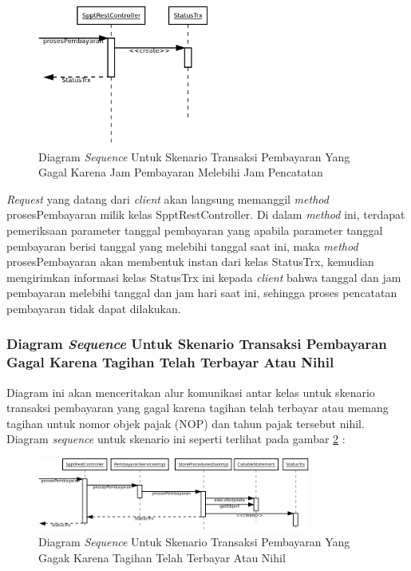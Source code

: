 \documentclass[pdftex,12pt, oneside]{article}
\begin{document}
\begin{figure}[H]
  \centering
  \includegraphics[width=0.5\textwidth]{./resources/uml/uml-seq-trx-tgl-bayar-error}
  \caption{Diagram \textit{Sequence} Untuk Skenario Transaksi Pembayaran Yang Gagal Karena Jam Pembayaran Melebihi Jam Pencatatan}
  \label{fig:uml-seq-trx-tgl-bayar-error}
\end{figure}

\textit{Request} yang datang dari \textit{client} akan langsung memanggil \textit{method} prosesPembayaran milik kelas SpptRestController. Di dalam \textit{method} ini, terdapat pemeriksaan parameter tanggal pembayaran yang apabila parameter tanggal pembayaran berisi tanggal yang melebihi tanggal saat ini, maka \textit{method} prosesPembayaran akan membentuk instan dari kelas StatusTrx, kemudian mengirimkan informasi kelas StatusTrx ini kepada \textit{client} bahwa tanggal dan jam pembayaran melebihi tanggal dan jam hari saat ini, sehingga proses pencatatan pembayaran tidak dapat dilakukan.

\subsubsection{Diagram \textit{Sequence} Untuk Skenario Transaksi Pembayaran Gagal Karena Tagihan Telah Terbayar Atau Nihil}

Diagram ini akan menceritakan alur komunikasi antar kelas untuk skenario transaksi pembayaran yang gagal karena tagihan telah terbayar atau memang tagihan untuk nomor objek pajak (NOP) dan tahun pajak tersebut nihil. Diagram \textit{sequence} untuk skenario ini seperti terlihat pada gambar \ref{fig:uml-seq-trx-nihil} :

\begin{figure}[H]
  \centering
  \includegraphics[width=0.8\textwidth]{./resources/uml/uml-seq-trx-nihil}
  \caption{Diagram \textit{Sequence} Untuk Skenario Transaksi Pembayaran Yang Gagak Karena Tagihan Telah Terbayar Atau Nihil}
  \label{fig:uml-seq-trx-nihil}
\end{figure}
\end{document}
